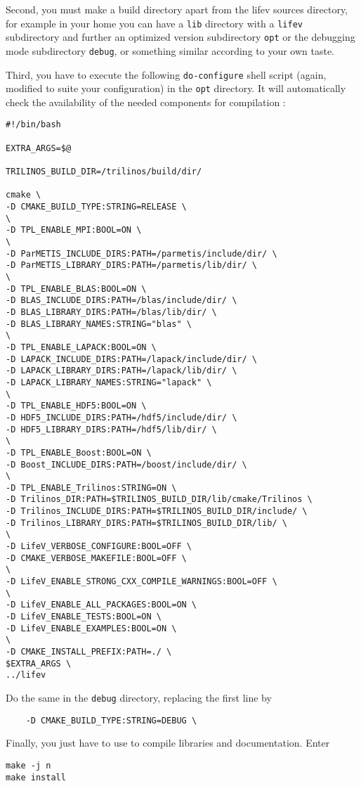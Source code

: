 Second, you must make a build directory apart from the
lifev sources directory, for example in your home you can have a
\verb!lib! directory with a \verb!lifev! subdirectory and further
an optimized version subdirectory \verb!opt! or the debugging mode
subdirectory \verb!debug!, or something similar according to your own taste.

Third, you have to execute the following
\verb+do-configure+ shell script (again, modified to suite your configuration) in the \verb!opt! directory.
It will automatically check the availability of the needed components
for \lifev compilation :


\begin{lstlisting}
#!/bin/bash

EXTRA_ARGS=$@

TRILINOS_BUILD_DIR=/trilinos/build/dir/

cmake \
-D CMAKE_BUILD_TYPE:STRING=RELEASE \
\
-D TPL_ENABLE_MPI:BOOL=ON \
\
-D ParMETIS_INCLUDE_DIRS:PATH=/parmetis/include/dir/ \
-D ParMETIS_LIBRARY_DIRS:PATH=/parmetis/lib/dir/ \
\
-D TPL_ENABLE_BLAS:BOOL=ON \
-D BLAS_INCLUDE_DIRS:PATH=/blas/include/dir/ \
-D BLAS_LIBRARY_DIRS:PATH=/blas/lib/dir/ \
-D BLAS_LIBRARY_NAMES:STRING="blas" \
\
-D TPL_ENABLE_LAPACK:BOOL=ON \
-D LAPACK_INCLUDE_DIRS:PATH=/lapack/include/dir/ \
-D LAPACK_LIBRARY_DIRS:PATH=/lapack/lib/dir/ \
-D LAPACK_LIBRARY_NAMES:STRING="lapack" \
\
-D TPL_ENABLE_HDF5:BOOL=ON \
-D HDF5_INCLUDE_DIRS:PATH=/hdf5/include/dir/ \
-D HDF5_LIBRARY_DIRS:PATH=/hdf5/lib/dir/ \
\
-D TPL_ENABLE_Boost:BOOL=ON \
-D Boost_INCLUDE_DIRS:PATH=/boost/include/dir/ \
\
-D TPL_ENABLE_Trilinos:STRING=ON \
-D Trilinos_DIR:PATH=$TRILINOS_BUILD_DIR/lib/cmake/Trilinos \
-D Trilinos_INCLUDE_DIRS:PATH=$TRILINOS_BUILD_DIR/include/ \
-D Trilinos_LIBRARY_DIRS:PATH=$TRILINOS_BUILD_DIR/lib/ \
\
-D LifeV_VERBOSE_CONFIGURE:BOOL=OFF \
-D CMAKE_VERBOSE_MAKEFILE:BOOL=OFF \
\
-D LifeV_ENABLE_STRONG_CXX_COMPILE_WARNINGS:BOOL=OFF \
\
-D LifeV_ENABLE_ALL_PACKAGES:BOOL=ON \
-D LifeV_ENABLE_TESTS:BOOL=ON \
-D LifeV_ENABLE_EXAMPLES:BOOL=ON \
\
-D CMAKE_INSTALL_PREFIX:PATH=./ \
$EXTRA_ARGS \
../lifev
\end{lstlisting}

Do the same in the \verb!debug! directory, replacing the first line by \begin{lstlisting}    -D CMAKE_BUILD_TYPE:STRING=DEBUG \  \end{lstlisting}


\noindent Finally, you just have to use \ixv{make} to compile \lifev libraries and documentation.
Enter
\begin{lstlisting}
make -j n
make install
\end{lstlisting}

